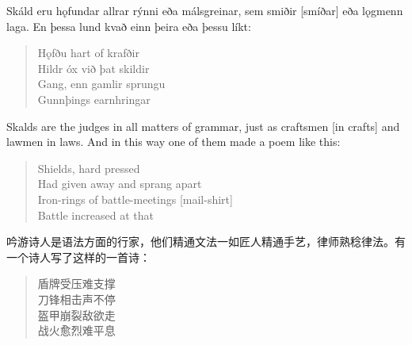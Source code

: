 \begin{paracol}{2}
  Skáld eru hǫfundar allrar rýnni eða málsgreinar, sem smiðir [smíðar] eða lǫgmenn laga. En þessa lund kvað einn þeira eða þessu líkt:
  \begin{quote}
    Hǫfðu hart of krafðir\\
    Hildr óx við þat skildir\\
    Gang, enn gamlir sprungu\\
    Gunnþings earnhringar\footnotemark
  \end{quote}
  \switchcolumn
  Skalds are the judges in all matters of grammar, just as craftsmen [in crafts] and lawmen in laws. And in this way one of them made a poem like this:
  \begin{quote}
    Shields, hard pressed\\
    Had given away and sprang apart\\
    Iron-rings of battle-meetings [mail-shirt]\\
    Battle increased at that\\
  \end{quote}

\end{paracol}

\begin{translation*}{}
  吟游诗人是语法方面的行家，他们精通文法一如匠人精通手艺，律师熟稔律法。有一个诗人写了这样的一首诗：
  \begin{quote}
    盾牌受压难支撑\\
    刀锋相击声不停\\
    盔甲崩裂敌欲走\\
    战火愈烈难平息
  \end{quote}
\end{translation*}

